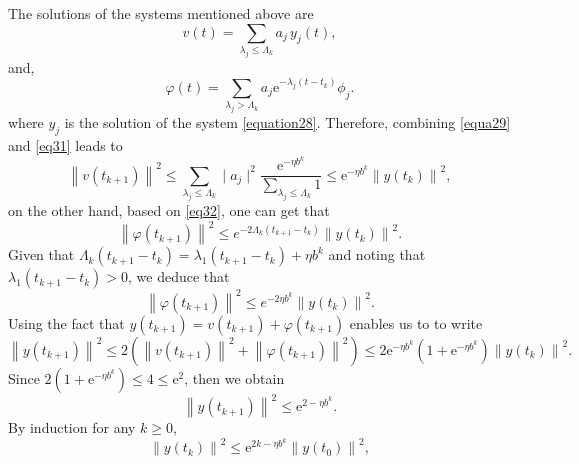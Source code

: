 \documentclass[sn-mathphys]{sn-jnl}
\begin{document}
The solutions of the systems mentioned above are
\begin{equation}\label{eq31}
v(t) = \sum_{\lambda_{j} \leq \Lambda_{k}} a_{j} \,y_{j}(t),  
\end{equation}
and,
\begin{equation}\label{eq32}
\varphi(t)=\sum_{\lambda_{j}>\Lambda_{k}} a_{j} \mathrm{e}^{-\lambda_{j}\left(t-t_{k}\right)} \phi_{j}.
\end{equation}
where $y_{j}$ is the solution of the system \eqref{equation28}. Therefore, combining \eqref{equa29} and \eqref{eq31} leads to
\begin{equation}\label{eq42}
\left\|v\left(t_{k+1}\right)\right\|^{2} \leq \sum_{\lambda_{j} \leq \Lambda_{k}}\mid a_{j}\mid^{2} \frac{\mathrm{e}^{-\eta b^{ k}}}{\displaystyle\sum_{\lambda_{j} \leq \Lambda_{k}} 1} \leq \mathrm{e}^{- \eta b^{ k}}\left\|y\left(t_{k}\right)\right\|^{2},
\end{equation}
on the other hand, based on \eqref{eq32}, one can get that
\begin{equation*}
\left\|\varphi\left(t_{k+1}\right)\right\|^{2} \leq e^{-2\Lambda_{k}\left(t_{k+1}-t_{k}\right)}\left\|y\left(t_{k}\right)\right\|^{2}.
\end{equation*}
Given that $ \Lambda_{k}\left(t_{k+1}-t_{k}\right)= \lambda_{1}\left(t_{k+1}-t_{k}\right) + \eta b^{ k}$ and noting that $\lambda_{1}\left(t_{k+1}-t_{k}\right)>0$, we deduce that
\begin{equation*}
\left\|\varphi\left(t_{k+1}\right)\right\|^{2} \leq e^{-2\eta b^{ k}}\left\|y\left(t_{k}\right)\right\|^{2}.
\end{equation*}
Using the fact that $y\left(t_{k+1}\right) = v\left(t_{k+1}\right)  + \varphi\left(t_{k+1}\right)$ enables us to to write
\begin{equation*}
\left\|y\left(t_{k+1}\right)\right\|^{2} \leq 2\left(\left\|v\left(t_{k+1}\right)\right\|^{2}+\left\|\varphi\left(t_{k+1}\right)\right\|^{2}\right) \leq  2\mathrm{e}^{- \eta b^{ k}}\left(  1+\mathrm{e}^{-\eta b^k}\right)\left\|y\left(t_{k}\right)\right\|^{2}.
\end{equation*}
Since $2\left(  1+\mathrm{e}^{-\eta b^k}\right)\leq 4 \leq \mathrm{e}^2$, then we obtain
\begin{equation}
   \left\|y\left(t_{k+1}\right)\right\|^{2} \leq\mathrm{e}^{2-\eta b^k}.
\end{equation}
By induction for any $k \geq 0$,
\begin{equation}\label{equ46}
    \left\|y\left(t_{k}\right)\right\|^{2} \leq \mathrm{e}^{2k- \eta b^{ k}}\left\|y\left(t_{0}\right)\right\|^{2},
\end{equation}
\end{document}
